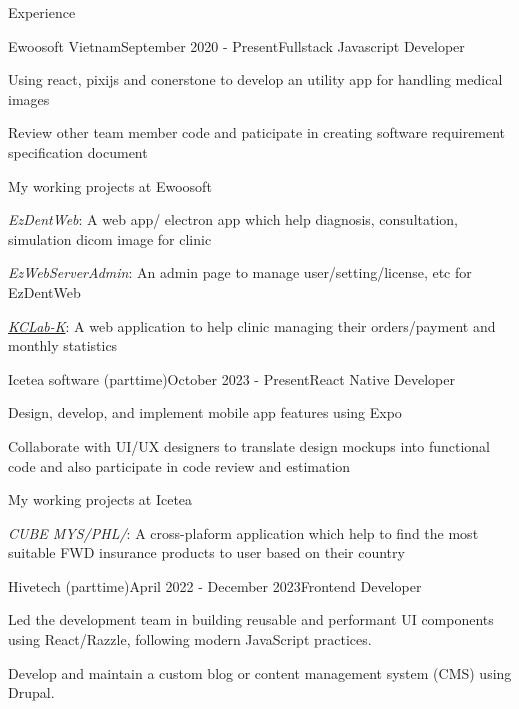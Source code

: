 \documentclass{resume}
\begin{document}
  \begin{rSection}{Experience}
    \begin{rSubsection}{Ewoosoft Vietnam}{September 2020 - Present}{Fullstack Javascript Developer}{}
      \item Using react, pixijs and conerstone to develop an utility app for handling medical images
      \item Review other team member code and paticipate in creating software requirement specification document 
    \end{rSubsection}

    \vspace{-0.5cm}\begin{rSubsection}{}{}{My working projects at Ewoosoft}{}
      \item {\emph{EzDentWeb}}: A web app/ electron app which help diagnosis, consultation, simulation dicom image for clinic
      \item {\emph{EzWebServerAdmin}}: An admin page to manage user/setting/license, etc for EzDentWeb
      \item \href{https://intro.kr.dentalcleverlab.com/}{\emph{KCLab-K}}: A web application to help clinic managing their orders/payment and monthly statistics
    \end{rSubsection}

    \newpage

    \begin{rSubsection}{Icetea software (parttime)}{October 2023 - Present}{React Native Developer}{}
      \item Design, develop, and implement mobile app features using Expo
      \item Collaborate with UI/UX designers to translate design mockups into functional code and also participate in code review and estimation
    \end{rSubsection}

    \vspace{-0.5cm}\begin{rSubsection}{}{}{My working projects at Icetea}{}
      \item {\emph{CUBE MYS/PHL/}}: A cross-plaform application which help to find the most suitable FWD insurance products to user based on their country
    \end{rSubsection}

    \vspace{0.8cm}\begin{rSubsection}{Hivetech (parttime)}{April 2022 - December 2023}{Frontend Developer}{}
      \item Led the development team in building reusable and performant UI components using React/Razzle, following modern JavaScript practices.
      \item Develop and maintain a custom blog or content management system (CMS) using Drupal. 
    \end{rSubsection}


\end{rSection}
\end{document}
